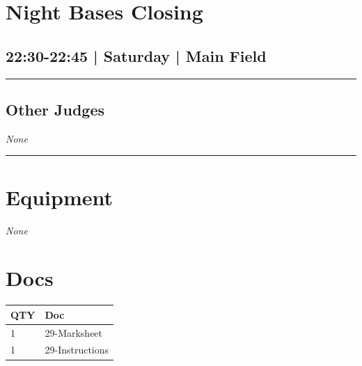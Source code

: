 \documentclass[10pt, A5]{article}
\begin{document}
        \begin{framed}
        \begin{minipage}{\textwidth}

        \setcounter{section}{47}
        \section{Night Bases Closing}
        \subsection*{22:30-22:45 | Saturday | Main Field}

        \vspace{0.25cm}
        \hrule
        \vspace{0.25cm}


        \subsection*{Other Judges}
                \textit{None}

            \vspace{0.25cm}
        \hrule
        \vspace{0.25cm}

        \begin{multicols}{2}

		\section*{\faWrench \: Equipment}

				\textit{None}
		
		\vfill\null
		\columnbreak

			\section*{\faFile \: Docs}
		 	\begin{center}
			\begin{tabular}{p{2cm}p{4cm}}

			\textbf{QTY} & \textbf{Doc} \\\toprule
										1&29-Marksheet\\\midrule
										1&29-Instructions\\\midrule
							\end{tabular}
			\end{center}
	

		\vfill\null

		\end{multicols}
\end{minipage}
\end{framed}
\end{document}

